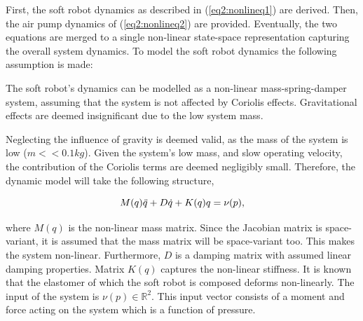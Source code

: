 First, the soft robot dynamics as described in (\ref{eq2:nonlineq1}) are derived. Then, the air pump dynamics of (\ref{eq2:nonlineq2}) are provided. Eventually, the two equations are merged to a single non-linear state-space representation capturing the overall system dynamics. To model the soft robot dynamics the following assumption is made:

\begin{theorem}
The soft robot's dynamics can be modelled as a non-linear mass-spring-damper system, assuming that the system is not affected by Coriolis effects. Gravitational effects are deemed insignificant due to the low system mass.
\end{theorem}

Neglecting the influence of gravity is deemed valid, as the mass of the system is low ($m << 0.1 kg$). Given the system's low mass, and slow operating velocity, the contribution of the Coriolis terms are deemed negligibly small. Therefore, the dynamic model will take the following structure,


\begin{equation}
    M(q)\Ddot{q} + D\dot{q} + K(q)q = \nu(p),
    \label{eq2:simp_model}
\end{equation}


where $M(q)$ is the non-linear mass matrix. Since the Jacobian matrix is space-variant, it is assumed that the mass matrix will be space-variant too. This makes the system non-linear. Furthermore, $D$ is a damping matrix with assumed linear damping properties. Matrix $K(q)$ captures the non-linear stiffness. It is known that the elastomer of which the soft robot is composed deforms non-linearly. The input of the system is $\nu(p) \in \mathbb{R}^2$. This input vector consists of a moment and force acting on the system which is a function of pressure. 

